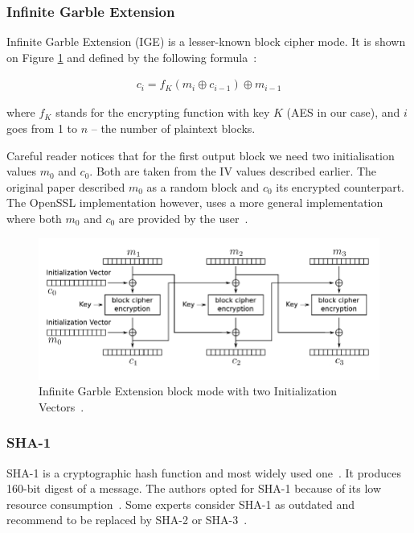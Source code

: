 \documentclass[thesis=M,english]{FITthesis}[2012/10/20]
\begin{document}
\subsubsection{Infinite Garble Extension}

Infinite Garble Extension (IGE) is a lesser-known block cipher mode. It is shown on Figure \ref{img:crypto-regular-ige-enc} and defined by the following formula~\cite{telegram-openssl-ige}:

\begin{gather*}
c_i = f_K(m_i \oplus c_{i-1}) \oplus m_{i-1}
\end{gather*}

where $f_K$ stands for the encrypting function with key $K$ (AES in our case), and $i$ goes from 1 to $n$ -- the number of plaintext blocks.

Careful reader notices that for the first output block we need two initialisation values $m_0$ and $c_0$. Both are taken from the IV values described earlier. The original paper described $m_0$ as a random block and $c_0$ its encrypted counterpart. The OpenSSL implementation however, uses a more general implementation where both $m_0$ and $c_0$ are provided by the user~\cite{telegram-openssl-ige}.

\begin{figure}[htb]
	\centering
	\includegraphics[width=1\textwidth]{ige-enc.pdf}
	\caption[IGE block cipher mode]{Infinite Garble Extension block mode with two Initialization Vectors~\cite{telegram-aarhus}.}
	\label{img:crypto-regular-ige-enc}
\end{figure}

\subsubsection{SHA-1}

SHA-1 is a cryptographic hash function and most widely used one~\cite{understanding-crypto}. It produces 160-bit digest of a message. The authors opted for SHA-1 because of its low resource consumption~\cite{telegram-sha1}. Some experts consider SHA-1 as outdated and recommend to be replaced by SHA-2 or SHA-3~\cite{telegram-sha1}.
\end{document}
